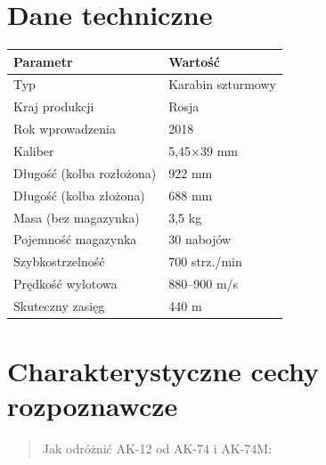 \documentclass[12pt,openany,oneside]{book}
\begin{document}
\section{Dane techniczne}\label{dane-techniczne-47}

\begin{longtable}[]{@{}ll@{}}
\toprule\noalign{}
Parametr & Wartość \\
\midrule\noalign{}
\endhead
\bottomrule\noalign{}
\endlastfoot
Typ & Karabin szturmowy \\
Kraj produkcji & Rosja \\
Rok wprowadzenia & 2018 \\
Kaliber & 5,45×39 mm \\
Długość (kolba rozłożona) & 922 mm \\
Długość (kolba złożona) & 688 mm \\
Masa (bez magazynka) & 3,5 kg \\
Pojemność magazynka & 30 nabojów \\
Szybkostrzelność & 700 strz./min \\
Prędkość wylotowa & 880--900 m/s \\
Skuteczny zasięg & 440 m \\
\end{longtable}

\section{Charakterystyczne cechy
rozpoznawcze}\label{charakterystyczne-cechy-rozpoznawcze-47}

\begin{quote}
Jak odróżnić AK-12 od AK-74 i AK-74M:
\end{quote}
\end{document}
